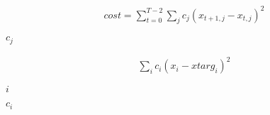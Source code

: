 \documentclass{article}
\begin{document}
\begin{align*} cost = \sum_{t=0}^{T-2} \sum_j c_j (x_{t+1,j} - x_{t,j})^2 \end{align*}
\pagebreak

$c_j$
\pagebreak

\begin{align*} \sum_i c_i (x_i - xtarg_i)^2 \end{align*}
\pagebreak

$i$
\pagebreak

$c_i$
\pagebreak
\end{document}
